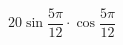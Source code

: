 \begin{ex}[type=calculate]
	\begin{condition}
		\( 20\sin\dfrac{5\pi}{12}\cdot\cos\dfrac{5\pi}{12} \)
	\end{condition}
\end{ex}